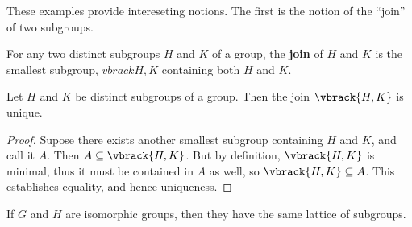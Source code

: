 These examples provide intereseting notions. The first is the notion of the
``join'' of two subgroups.

\begin{definition}
    For any two distinct subgroups $H$ and $K$ of a group, the \textbf{join} of
    $H$ and  $K$ is the smallest subgroup, $vbrack{H,K}$ containing both  $H$
    and  $K$.
\end{definition}

\begin{lemma}\label{2.5.1}
    Let $H$ and  $K$ be distinct subgroups of a group. Then the join
    $\vbrack{H,K}$ is unique.
\end{lemma}
\begin{proof}
    Supose there exists another smallest subgroup containing $H$ and $K$, and
    call it $A$. Then  $A \subseteq \vbrack{H,K}$. But by definition,
    $\vbrack{H,K}$ is minimal, thus it must be contained in $A$ as well, so
    $\vbrack{H,K} \subseteq A$. This establishes equality, and hence uniqueness.
\end{proof}

\begin{lemma}\label{2.5.2}
    If $G$ and  $H$ are isomorphic groups, then they have the same lattice of
    subgroups.
\end{lemma}
